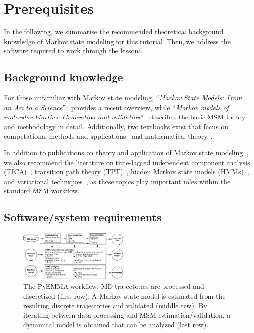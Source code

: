 \documentclass[9pt,tutorial]{livecoms}
\begin{document}
\section{Prerequisites}

In the following, we summarize the recommended theoretical background knowledge of Markov state modeling for this tutorial.
Then, we address the software required to work through the lessons.

\subsection{Background knowledge}
\label{sec:background}

For those unfamiliar with Markov state modeling, ``\emph{Markov State Models: From an Art to a Science}''~\cite{msm-brooke} provides a recent overview, while ``\emph{Markov models of molecular kinetics: Generation and validation}''~\cite{msm-jhp} describes the basic MSM theory and methodology in detail. Additionally, two textbooks exist that focus on computational methods and applications~\cite{msm-book} and mathematical theory~\cite{schuette-sarich-book}.

In addition to publications on theory and application of Markov state modeling~\cite{schuette-msm,buchete-msm-2008,noe-tmat-sampling,bowman-msm-2009,noe-folding-pathways,sarich-msm-quality,noe-fingerprints,noe-dy-neut-scatt,Chodera2014,ben-rev-msm,simon-mech-mod-nmr,oom-feliks,simon-amm},
we also recommend the literature on time-lagged independent component analysis (TICA)~\cite{tica,tica3,tica2,kinetic-maps}, transition path theory (TPT)~\cite{weinan-tpt,metzner-msm-tpt},
hidden Markov state models (HMMs)~\cite{noe-proj-hid-msm,hmm-baum-welch-alg,hmm-tutorial}, and variational techniques~\cite{noe-vac,vamp-preprint,gmrq}, as these topics play important roles within the standard MSM workflow.

\subsection{Software/system requirements}

\begin{figure}
\includegraphics[width=0.48\textwidth]{figure_1}
\caption{The PyEMMA workflow: MD trajectories are processed and discretized (first row). A Markov state model is estimated from the resulting discrete trajectories and validated (middle row). By iterating between data processing and MSM estimation/validation, a dynamical model is obtained that can be analyzed (last row).}
\label{fig:workflowchart}
\end{figure}
\end{document}
